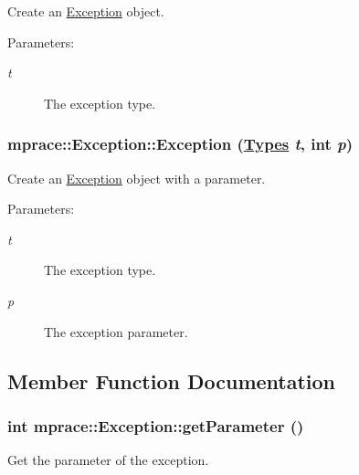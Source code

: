 Create an \hyperlink{classmprace_1_1Exception}{Exception} object. 

\begin{Desc}
\item[Parameters:]
\begin{description}
\item[{\em t}]The exception type.\end{description}
\end{Desc}
\hypertarget{classmprace_1_1Exception_a1}{
\subsubsection[Exception]{\setlength{\rightskip}{0pt plus 5cm}mprace::Exception::Exception (\hyperlink{classmprace_1_1Exception_w12}{Types} {\em t}, int {\em p})}}
\label{classmprace_1_1Exception_a1}


Create an \hyperlink{classmprace_1_1Exception}{Exception} object with a parameter. 

\begin{Desc}
\item[Parameters:]
\begin{description}
\item[{\em t}]The exception type. \item[{\em p}]The exception parameter.\end{description}
\end{Desc}


\subsection{Member Function Documentation}
\hypertarget{classmprace_1_1Exception_a3}{
\subsubsection[getParameter]{\setlength{\rightskip}{0pt plus 5cm}int mprace::Exception::get\-Parameter ()}}
\label{classmprace_1_1Exception_a3}


Get the parameter of the exception. 

